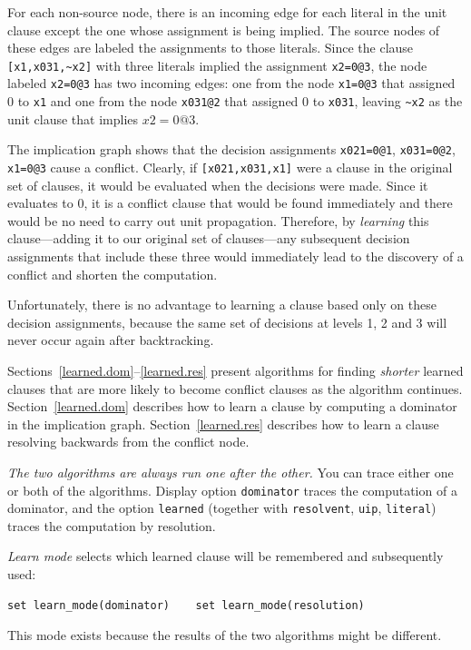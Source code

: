 \documentclass[11pt]{article}
\newcommand*{\p}[1]{\textup{\texttt{#1}}}
\begin{document}
For each non-source node, there is an incoming edge for each literal in
the unit clause except the one whose assignment is being implied.
The source nodes of these edges are labeled the assignments to those
literals. Since the clause \verb+[x1,x031,~x2]+ with three literals
implied the assignment \p{x2=0@3}, the node labeled \p{x2=0@3} has
two incoming edges: one from the node \p{x1=0@3} that assigned 0 to
\p{x1} and one from the node \p{x031@2} that assigned 0 to \p{x031},
leaving \verb+~x2+ as the unit clause that implies $x2=0@3$.

The implication graph shows that the decision assignments \p{x021=0@1},
\p{x031=0@2}, \p{x1=0@3} cause a conflict. Clearly, if
\verb+[x021,x031,x1]+ were a clause in the original set of clauses, it
would be evaluated when the decisions were made. Since it evaluates to
0, it is a conflict clause that would be found immediately and there
would be no need to carry out unit propagation. Therefore, by
\emph{learning} this clause---adding it to our original set of
clauses---any subsequent decision assignments that include these three
would immediately lead to the discovery of a conflict and shorten the
computation.

Unfortunately, there is no advantage to learning a clause based only on
these decision assignments, because the same set of decisions at levels
1, 2 and 3 will never occur again after backtracking.

Sections~\ref{learned.dom}--\ref{learned.res} present algorithms for
finding \emph{shorter} learned clauses that are more likely to become
conflict clauses as the algorithm continues. Section~\ref{learned.dom}
describes how to learn a clause by computing a dominator in the
implication graph. Section~\ref{learned.res} describes how to learn a
clause resolving backwards from the conflict node.

\emph{The two algorithms are always run one after the other.} You can
trace either one or both of the algorithms. Display option \p{dominator}
traces the computation of a dominator, and the option \p{learned}
(together with \p{resolvent}, \p{uip}, \p{literal}) traces the
computation by resolution.

\emph{Learn mode} selects which learned clause will be remembered and
subsequently used:
\begin{verbatim}
set learn_mode(dominator)    set learn_mode(resolution)
\end{verbatim}
This mode exists because the results of the two algorithms might be
different.
\end{document}
